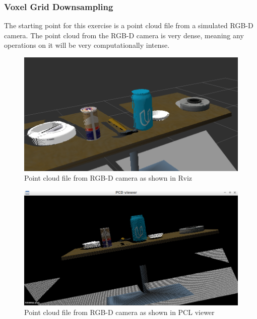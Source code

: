 \documentclass{article}
\begin{document}
\subsubsection{Voxel Grid Downsampling}
The starting point for this exercise is a point cloud file from a simulated RGB-D camera. The point cloud from the RGB-D camera is very dense, meaning any operations on it will be very computationally intense.

\begin{figure}[H]
    \includegraphics[width=\linewidth]{sspc.png}
    \caption{Point cloud file from RGB-D camera as shown in Rviz}
    \label{fig:Rvizcamera}
\end{figure}

\begin{figure}[H]
    \includegraphics[width=\linewidth]{ex1tabletop.png}
    \caption{Point cloud file from RGB-D camera as shown in PCL viewer}
    \label{fig:camera}
\end{figure}
\end{document}
